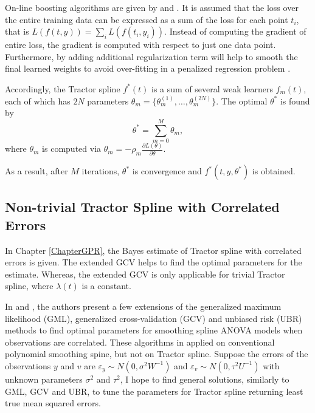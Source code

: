 On-line boosting algorithms are given by \cite{babenko2009family} and \cite{beygelzimer2015online}. It is assumed that the loss over the entire training data can be expressed as a sum of the loss for each point $t_i$, that is $L(f(t,y))=\sum_i L(f(t_i,y_i))$. Instead of computing the gradient of entire
loss, the gradient is computed with respect to just one data point. Furthermore, by adding additional regularization term will help to smooth the final learned weights to avoid over-fitting in a penalized regression problem \cite{chen2016xgboost}. 

Accordingly, the Tractor spline $f^*(t)$ is a sum of several weak learners $f_m(t)$, each of which has $2N$ parameters $\theta_m=\{\theta_m^{(1)},\ldots,\theta_m^{(2N)}\}$. The optimal $\theta^*$ is found by 
\begin{equation*}
\theta^*=\sum_{m=0}^{M}\theta_m,
\end{equation*}
where $\theta_m$ is computed via $\theta_m=-\rho_m\frac{\partial L(\theta)}{\partial \theta}$. 

As a result, after $M$ iterations, $\theta^*$ is convergence and $f^*(t,y,\theta^*)$ is obtained. 



%



\subsection*{Non-trivial Tractor Spline with Correlated Errors}

In Chapter \ref{ChapterGPR}, the Bayes estimate of Tractor spline with correlated errors is given. The extended GCV helps to find the optimal parameters for the estimate. Whereas, the extended GCV is only applicable for trivial Tractor spline, where $\lambda(t)$ is a constant. 


In \cite{opsomer2001nonparametric} and \cite{wang1998smoothing}, the authors present a few extensions of the generalized maximum likelihood (GML), generalized cross-validation (GCV) and unbiased risk (UBR) methods to find optimal parameters for smoothing spline ANOVA models when observations are correlated. These algorithms in applied on conventional polynomial smoothing spine, but not on Tractor spline. Suppose the errors of the observations $y$ and $v$ are $\varepsilon_y\sim N(0,\sigma^2W^{-1})$ and $\varepsilon_v\sim N(0,\tau^2U^{-1})$ with unknown parameters $\sigma^2$ and $\tau^2$, I hope to find general solutions, similarly to GML, GCV and UBR, to tune the parameters for Tractor spline returning least true mean squared errors. 




